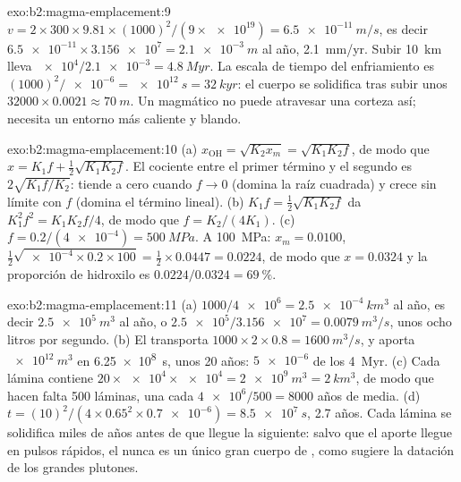 \begin{solution}{exo:b2:magma-emplacement:9}
$v = 2\times300\times9.81\times(1000)^2/(9\times\num{e19}) = \qty{6.5e-11}{m/s}$, es decir
$\num{6.5e-11}\times\num{3.156e7} = \qty{2.1e-3}{m}$ al año, \qty{2.1}{mm/yr}. Subir
\qty{10}{km} lleva $\num{e4}/\num{2.1e-3} = \qty{4.8}{Myr}$. La escala de tiempo del enfriamiento
es $(1000)^2/\num{e-6} = \qty{e12}{s} = \qty{32}{kyr}$: el cuerpo se solidifica tras
subir unos $32000\times0.0021 \approx \qty{70}{m}$. Un  magmático no puede atravesar
una corteza así; necesita un entorno más caliente y blando.
\end{solution}

\begin{solution}{exo:b2:magma-emplacement:10}
(a) $x_{\mathrm{OH}} = \sqrt{K_2x_m} = \sqrt{K_1K_2f}$, de modo que $x = K_1f + \frac12\sqrt{K_1K_2f}$.
El cociente entre el primer término y el segundo es $2\sqrt{K_1f/K_2}$: tiende a cero
cuando $f \to 0$ (domina la raíz cuadrada) y crece sin límite con $f$ (domina el
término lineal). (b) $K_1 f = \frac12\sqrt{K_1K_2 f}$ da $K_1^2f^2 =
K_1K_2f/4$, de modo que $f = K_2/(4K_1)$. (c) $f = 0.2/(\num{4e-4}) = \qty{500}{MPa}$. A
\qty{100}{MPa}: $x_m = 0.0100$, $\frac12\sqrt{\num{e-4}\times0.2\times100} =
\frac12\times0.0447 = 0.0224$, de modo que $x = 0.0324$ y la proporción de hidroxilo es
$0.0224/0.0324 = \qty{69}{\percent}$.
\end{solution}

\begin{solution}{exo:b2:magma-emplacement:11}
(a) $1000/\num{4e6} = \qty{2.5e-4}{km^3}$ al año, es decir $\qty{2.5e5}{m^3}$ al año,
o $\num{2.5e5}/\num{3.156e7} = \qty{0.0079}{m^3/s}$, unos ocho litros por segundo.
(b) El  transporta $1000\times2\times0.8 = \qty{1600}{m^3/s}$, y aporta
$\qty{e12}{m^3}$ en \qty{6.25e8}{s}, unos 20 años: $\num{5e-6}$ de los
\qty{4}{Myr}. (c) Cada lámina contiene $20\times\num{e4}\times\num{e4} = \qty{2e9}{m^3} =
\qty{2}{km^3}$, de modo que hacen falta 500 láminas, una cada $\num{4e6}/500 = 8000$ años de media.
(d) $t = (10)^2/(4\times0.65^2\times\num{0.7e-6}) = \qty{8.5e7}{s}$, 2.7 años. Cada
lámina se solidifica miles de años antes de que llegue la siguiente: salvo que el aporte
llegue en pulsos rápidos, el  nunca es un único gran cuerpo de , como sugiere la
datación de los grandes plutones.
\end{solution}

